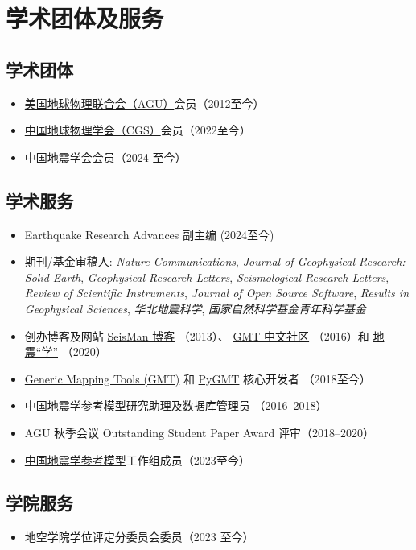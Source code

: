 \section{学术团体及服务}

\subsection{学术团体}
\begin{itemize}
\item \href{https://sites.agu.org/}{美国地球物理联合会（AGU）}会员（2012至今）
\item \href{http://www.cgscgs.org.cn/}{中国地球物理学会（CGS）}会员（2022至今）
\item \href{https://www.ssoc.org.cn/}{中国地震学会}会员（2024 至今）
\end{itemize}

\subsection{学术服务}
\begin{itemize}
\item Earthquake Research Advances 副主编 (2024至今)
\item 期刊/基金审稿人:
      \emph{Nature Communications},
      \emph{Journal of Geophysical Research: Solid Earth},
      \emph{Geophysical Research Letters},
      \emph{Seismological Research Letters},
      \emph{Review of Scientific Instruments},
      \emph{Journal of Open Source Software},
      \emph{Results in Geophysical Sciences},
      \emph{华北地震科学},
      \emph{国家自然科学基金青年科学基金}
\item 创办博客及网站
      \href{https://blog.seisman.info}{SeisMan 博客} （2013）、
      \href{http://gmt-china.org/}{GMT 中文社区} （2016）和
      \href{https://seismo-learn.org/}{地震``学''} （2020）
\item \href{https://github.com/GenericMappingTools/gmt}{Generic Mapping Tools (GMT)} 和
      \href{https://github.com/GenericMappingTools/pygmt}{PyGMT} 核心开发者 （2018至今）
\item \href{http://chinageorefmodel.org/}{中国地震学参考模型}研究助理及数据库管理员 （2016--2018）
\item AGU 秋季会议 Outstanding Student Paper Award 评审（2018--2020）
\item \href{http://chinageorefmodel.org/}{中国地震学参考模型}工作组成员（2023至今）
\end{itemize}

\subsection{学院服务}
\begin{itemize}
\item 地空学院学位评定分委员会委员（2023 至今）
\end{itemize}
